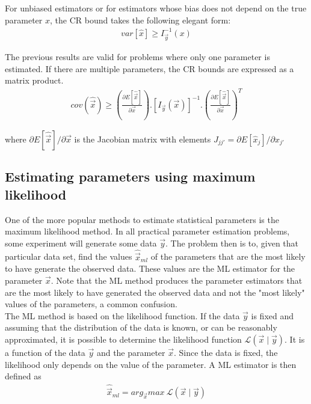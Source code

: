 \documentclass[report,12pt]{report}
\begin{document}
For unbiased estimators or for estimators whose bias does not depend on the true parameter $x$, the CR bound takes the following elegant form:
\begin{align}
	var[\hat x] \geq I_{\vec y}^{-1}(x)
\end{align}

The previous results are valid for problems where only one parameter is estimated. If there are multiple parameters, the CR bounds are expressed as a matrix product\cite{cramerRaoMultiDim}.
\begin{align}
	cov(\hat{\vec{x}}) \geq \left( \frac{\partial E[\hat{\vec{x}}]}{\partial \vec x} \right) 
	. [I_{\vec y}(\vec x)]^{-1}
	. \left( \frac{\partial E[\hat{\vec{x}}]}{\partial \vec x} \right)^T
	\label{eq:CramerRaoMultiDim}
\end{align}

where $\partial E[\hat{\vec{x}}] / \partial \vec x$ is the Jacobian matrix with elements $J_{jj'} = \partial E[\hat x_j] / \partial x_{j'}$




\subsection{Estimating parameters using maximum likelihood}\label{sec:mlmethod}
One of the more popular methods to estimate statistical parameters is the maximum likelihood method. In all practical parameter estimation problems, some experiment will generate some data $\vec y$. The problem then is to, given that particular data set, find the values $\hat{ \vec x}_{ml}$ of the parameters that are the most likely to have generate the observed data. These values are the ML estimator for the parameter $\vec x$. Note that the ML method produces the parameter estimators that are the most likely to have generated the observed data and not the "most likely" values of the parameters, a common confusion.\\

The ML method is based on the likelihood function. If the data $\vec y$ is fixed and assuming that the distribution of the data is known, or can be reasonably approximated, it is possible to determine the likelihood function $\mathcal{L}(\vec x \mid \vec y)$. It is a function of the data $\vec y$ and the parameter $\vec x$. Since the data  is fixed, the likelihood only depends on the value of the parameter. A ML estimator is then defined as
\begin{align}
	\hat{ \vec x}_{ml} = arg_{\vec{x}}max\ 
	\mathcal{L} \left( \vec x \mid \vec y \right)
\end{align}
	
\end{document}

